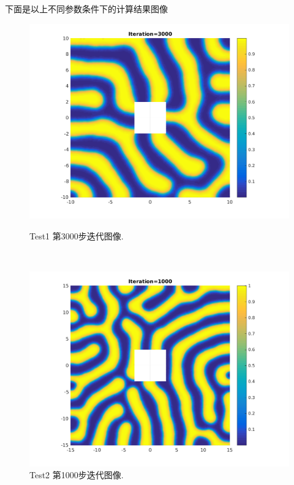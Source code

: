 \documentclass[12pt,a4paper]{article}
\begin{document}
下面是以上不同参数条件下的计算结果图像
\begin{figure}[h]
	\begin{minipage}[t]{0.4\linewidth}%
		\centering     %
		\includegraphics[width=1.2\textwidth]{./figures/01.png}
		\caption{Test1 第3000步迭代图像.}%
		\label{fig:liuchengtu1}%
	\end{minipage} 
	\hfill
	\begin{minipage}[t]{0.4\linewidth}
		\centering
		\includegraphics[width=1.2\textwidth]{./figures/02.png}
		\caption{Test2 第1000步迭代图像.}%
		\label{fig:liuchengtu2}
	\end{minipage}
    \hfill

\end{figure}
\end{document}
